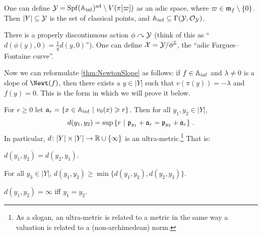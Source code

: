 \documentclass[a4paper, 10pt, oneside, DIV=9, chapterprefix=true, numbers=enddot,bibliography=totoc]{scrbook}
\begin{document}
\begin{rem}\label{rem:Y}
	\begin{numerate}
		\item One can define $\mathcal{Y}=\operatorname{Spf}(\mathbb{A}_{\mathrm{inf}})^\mathrm{ad}\setminus V(\pi[\varpi])$ as an adic space, where $\varpi\in\mathfrak{m}_f\setminus\{0\}$. Then $|Y|\subseteq \mathcal{Y}$ is the set of classical points, and $\mathbb{A}_{\mathrm{inf}}\subseteq \operatorname{\Gamma}(\mathcal{Y},\mathcal{O}_{\mathcal{Y}})$.
		\item There is a properly discontinuous action $\phi\curvearrowright\Yy$ (think of this as \enquote{$d(\phi(y),0)=\frac1qd(y,0)$}). One can define $\Xx=\Yy/\phi^\IZ$, the \enquote{adic Fargues--Fontaine curve}.
	\end{numerate}
\end{rem}
Now we can reformulate \cref{thm:NewtonSlope} as follows: if $f\in\mathbb{A}_{\mathrm{inf}}$ and $\lambda\neq 0$ is a slope of $\Newt(f)$, then there exists a $y\in |Y|$ such that $v(\pi(y))=-\lambda$ and $f(y)=0$. This is the form in which we will prove it below.
\begin{lem}\label{lem:d}
	For $r\geq 0$ let $\mathfrak{a}_r=\left\{x\in\mathbb{A}_{\mathrm{inf}}\ \middle|\  v_0(x)\geqslant r\right\}$. Then for all $y_1,y_2\in|Y|$,
	\begin{equation*}
		d(y_1,y_2)=\sup\left\{r\ \middle|\  \mathfrak{p}_{y_1}+\mathfrak{a}_r=\mathfrak{p}_{y_2}+\mathfrak{a}_r\right\}\,.
	\end{equation*}
	In particular, $d\colon |Y|\times|Y|\morphism \IR\cup\{\infty\}$ is an ultra-metric.\footnote{As a slogan, an ultra-metric is related to a metric in the same way a valuation is related to a (non-archimedean) norm.} That is:
	\begin{numerate}
		\item $d(y_1,y_2)=d(y_2,y_1)$.
		\item For all $y_3\in|Y|$, $d(y_1,y_2)\geq \min\{d(y_1,y_2),d(y_2,y_3)\}$.
		\item $d(y_1,y_2)=\infty$ iff $y_1=y_2$.
	\end{numerate}
\end{lem}
\end{document}
